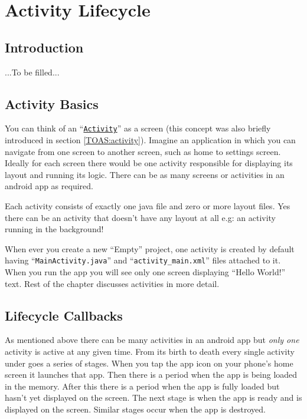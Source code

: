 \chapter{Activity Lifecycle}
\label{ALI:ALII}

\section{Introduction}
...To be filled...

\section{Activity Basics}
\label{ALI:activityBasics}

You can think of an ``\href{https://developer.android.com/guide/components/activities.html}{\texttt{Activity}}'' as a screen (this concept was also briefly introduced in section \ref{TOAS:activity}). Imagine an application in which you can navigate from one screen to another screen, such as home to settings screen. Ideally for each screen there would be one activity responsible for displaying its layout and running its logic. There can be as many screens or activities in an android app as required.

Each activity consists of exactly one java file and zero or more layout files. Yes there can be an activity that doesn't have any layout at all e.g: an activity running in the background! 

When ever you create a new ``Empty'' project, one activity is created by default having ``\texttt{MainActivity.java}'' and ``\texttt{activity\_main.xml}'' files attached to it. When you run the app you will see only one screen displaying ``Hello World!'' text. Rest of the chapter discusses activities in more detail. 

\section{Lifecycle Callbacks}
\label{ALI:lifecycleCallbacks}

As mentioned above there can be many activities in an android app but \textit{only one} activity is active at any given time. From its birth to death every single activity under goes a series of stages. When you tap the app icon on your phone's home screen it launches that app. Then there is a period when the app is being loaded in the memory. After this there is a period when the app is fully loaded but hasn't yet displayed on the screen. The next stage is when the app is ready and is displayed on the screen. Similar stages occur when the app is destroyed.

